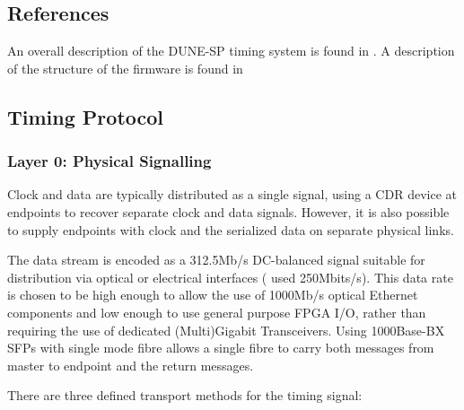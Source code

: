 \documentclass{dune}
\begin{document}
\subsection{References}

An overall description of the DUNE-SP timing system is found in \cite{ref:dts-sp-description}. A description of the structure of the firmware is found in \cite{ref:dts-sp-firmware}

\subsection{Timing Protocol}

\subsubsection{Layer 0: Physical Signalling}

Clock and data are typically distributed as a single signal, using a CDR device at endpoints to recover separate clock and data signals. However, it is also possible to supply endpoints with clock and the serialized data on separate physical links. 

The data stream is encoded as a 312.5Mb/s DC-balanced signal suitable for distribution via optical or electrical interfaces ( used 250Mbits/s). This data rate is chosen to be high enough to allow the use of 1000Mb/s optical Ethernet components and low enough to use general purpose FPGA I/O, rather than requiring the use of dedicated (Multi)Gigabit Transceivers. Using 1000Base-BX SFPs with single mode fibre allows a single fibre to carry both messages from master to endpoint and the return messages.

There are three defined transport methods for the timing signal:
\end{document}
